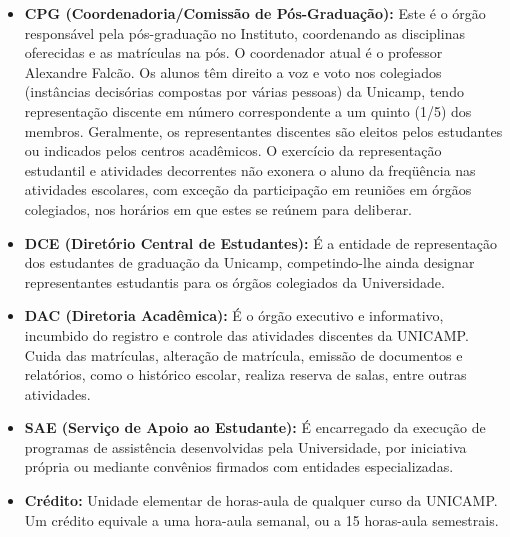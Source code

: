 \documentclass[a4paper,10pt]{article}
\begin{document}
\begin{itemize}
\item  \textbf{CPG (Coordenadoria/Comissão de Pós-Graduação):} Este é o órgão responsável pela pós-graduação no Instituto, coordenando as disciplinas oferecidas e as matrículas na pós. O coordenador atual é o professor Alexandre Falcão. Os alunos têm direito a voz e voto nos colegiados (instâncias decisórias compostas por várias pessoas) da Unicamp, tendo representação discente em número correspondente a um quinto (1/5) dos membros. Geralmente, os representantes discentes são eleitos pelos estudantes ou indicados pelos centros acadêmicos. O exercício da representação estudantil e atividades decorrentes não exonera o aluno da freqüência nas atividades escolares, com exceção da participação em reuniões em órgãos colegiados, nos horários em que estes se reúnem para deliberar.
\end{itemize}

\begin{itemize}
\item  \textbf{DCE (Diretório Central de Estudantes):} É a entidade de representação dos estudantes de graduação da Unicamp, competindo-lhe ainda designar representantes estudantis para os órgãos colegiados da Universidade.
\end{itemize}

\begin{itemize}
\item  \textbf{DAC (Diretoria Acadêmica):} É o órgão executivo e informativo, incumbido do registro e controle das atividades discentes da UNICAMP. Cuida das matrículas, alteração de matrícula, emissão de documentos e relatórios, como o histórico escolar, realiza reserva de salas, entre outras atividades.
\end{itemize}

\begin{itemize}
\item  \textbf{SAE (Serviço de Apoio ao Estudante):} É encarregado da execução de programas de assistência desenvolvidas pela Universidade, por iniciativa própria ou mediante convênios firmados com entidades especializadas.
\end{itemize}

\begin{itemize}
\item  \textbf{Crédito:} Unidade elementar de horas-aula de qualquer curso da UNICAMP. Um crédito equivale a uma hora-aula semanal, ou a 15 horas-aula semestrais.
\end{itemize}
\end{document}
